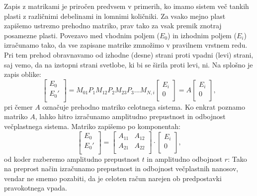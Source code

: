 Zapis z matrikami je priročen predvsem v primerih, ko imamo sistem več tankih plasti
z različnimi debelinami in lomnimi količniki. Za vsako mejno plast zapišemo
ustrezno prehodno matriko, prav tako za vsak premik znotraj posamezne plasti. 
Povezavo med vhodnim poljem ($E_0$) in izhodnim poljem ($E_i$) 
izračunamo tako, da vse zapisane matrike 
zmnožimo v pravilnem vrstnem redu. Pri tem 
prehod obravnavamo od izhodne (desne) strani proti vpadni (levi) strani, saj vemo, da na
izstopni strani svetlobe, ki bi se širila proti levi, ni. 
Na splošno je zapis oblike:
\begin{equation}
\left[\begin{array}{c}
E_{0}\\
E_{0}'\\
\end{array}\right] = 
M_{01}
P_1
M_{12}
P_2
M_{23}
P_3 ... M_{N,i}
\left[\begin{array}{c}
E_i\\
0\\
\end{array}\right] =
A
\left[\begin{array}{c}
E_i\\
0\\
\end{array}\right]\!\!,
\label{eq:06_63}
\end{equation}
pri čemer $A$ označuje prehodno matriko celotnega sistema. Ko enkrat 
poznamo matriko $A$, lahko hitro izračunamo amplitudno 
prepustnost in odbojnost večplastnega sistema. Matriko zapišemo
po komponentah:
\begin{equation}
\left[\begin{array}{c}
E_{0}\\
E_{0}'\\
\end{array}\right] =
\left[\begin{array}{cc}
A_{11}& A_{12}\\
A_{21}& A_{22}\\
\end{array}\right]\cdot
\left[\begin{array}{c}
E_i\\
0\\
\end{array}\right]\!\!,
\label{eq:06_64}
\end{equation}
od koder razberemo amplitudno prepustnost $t$ in amplitudno odbojnost
$r$:
Tako na preprost način izračunamo prepustnost in odbojnost
večplastnih nanosov, vendar ne smemo pozabiti, 
da je celoten račun narejen ob predpostavki pravokotnega vpada.

